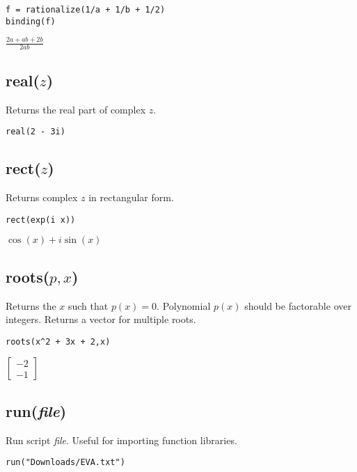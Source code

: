 {\color{blue}
\begin{verbatim}
f = rationalize(1/a + 1/b + 1/2)
binding(f)
\end{verbatim}
}

\noindent
$\displaystyle \frac{2a+ab+2b}{2ab}$

\subsection*{real($z$)}

Returns the real part of complex $z$.

{\color{blue}
\begin{verbatim}
real(2 - 3i)
\end{verbatim}
}


\subsection*{rect($z$)}

Returns complex $z$ in rectangular form.

{\color{blue}
\begin{verbatim}
rect(exp(i x))
\end{verbatim}
}

\noindent
$\displaystyle \cos(x)+i\sin(x)$

\subsection*{roots($p,x$)}

Returns the $x$ such that $p(x)=0$.
Polynomial $p(x)$ should be factorable over integers.
Returns a vector for multiple roots.

{\color{blue}
\begin{verbatim}
roots(x^2 + 3x + 2,x)
\end{verbatim}
}

\noindent
$\displaystyle
\begin{bmatrix}
-2\\
-1
\end{bmatrix}
$

\subsection*{run({\it file})}

Run script {\it file}.
Useful for importing function libraries.

{\color{blue}
\begin{verbatim}
run("Downloads/EVA.txt")
\end{verbatim}
}

